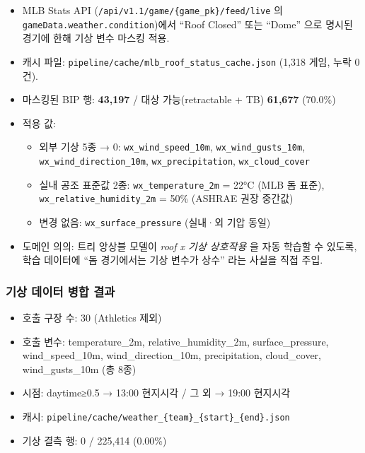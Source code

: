 \documentclass[
  11.5pt,
]{article}
\providecommand{\tightlist}{%
  \setlength{\itemsep}{0pt}\setlength{\parskip}{0pt}}
\begin{document}
\begin{itemize}
\tightlist
\item
  MLB Stats API (\texttt{/api/v1.1/game/\{game\_pk\}/feed/live} 의
  \texttt{gameData.weather.condition})에서 ``Roof Closed'' 또는 ``Dome''
  으로 명시된 경기에 한해 기상 변수 마스킹 적용.
\item
  캐시 파일: \texttt{pipeline/cache/mlb\_roof\_status\_cache.json}
  (1,318 게임, 누락 0건).
\item
  마스킹된 BIP 행: \textbf{43,197} / 대상 가능(retractable + TB)
  \textbf{61,677} (70.0\%)
\item
  적용 값:

  \begin{itemize}
  \tightlist
  \item
    외부 기상 5종 → 0: \texttt{wx\_wind\_speed\_10m},
    \texttt{wx\_wind\_gusts\_10m}, \texttt{wx\_wind\_direction\_10m},
    \texttt{wx\_precipitation}, \texttt{wx\_cloud\_cover}
  \item
    실내 공조 표준값 2종: \texttt{wx\_temperature\_2m} = 22°C (MLB 돔
    표준), \texttt{wx\_relative\_humidity\_2m} = 50\% (ASHRAE 권장
    중간값)
  \item
    변경 없음: \texttt{wx\_surface\_pressure} (실내·외 기압 동일)
  \end{itemize}
\item
  도메인 의의: 트리 앙상블 모델이 \emph{roof x 기상 상호작용} 을 자동
  학습할 수 있도록, 학습 데이터에 ``돔 경기에서는 기상 변수가 상수''
  라는 사실을 직접 주입.
\end{itemize}

\subsubsection{기상 데이터 병합
결과}\label{uxae30uxc0c1-uxb370uxc774uxd130-uxbcd1uxd569-uxacb0uxacfc}

\begin{itemize}
\tightlist
\item
  호출 구장 수: 30 (Athletics 제외)
\item
  호출 변수: temperature\_2m, relative\_humidity\_2m, surface\_pressure,
  wind\_speed\_10m, wind\_direction\_10m, precipitation, cloud\_cover,
  wind\_gusts\_10m (총 8종)
\item
  시점: daytime≥0.5 → 13:00 현지시각 / 그 외 → 19:00 현지시각
\item
  캐시:
  \texttt{pipeline/cache/weather\_\{team\}\_\{start\}\_\{end\}.json}
\item
  기상 결측 행: 0 / 225,414 (0.00\%)
\end{itemize}
\end{document}
